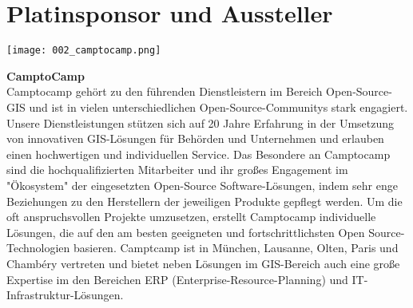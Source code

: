 \section*{Platinsponsor und Aussteller}
  \texttt{[image: 002\_camptocamp.png]}
  \vspace{1.0\baselineskip}
  
\noindent
    {\bfseries CamptoCamp}\\
    Camptocamp gehört zu den führenden Dienstleistern im Bereich Open-Source-GIS und ist in vielen unterschiedlichen Open-Source-Communitys stark engagiert.
\noindent
Unsere Dienstleistungen stützen sich auf 20 Jahre Erfahrung in der Umsetzung von innovativen GIS-Lösungen für Behörden und Unternehmen und erlauben einen hochwertigen und individuellen Service. Das Besondere an Camptocamp sind die hochqualifizierten Mitarbeiter und ihr großes Engagement im "Ökosystem" der eingesetzten Open-Source Software-Lösungen, indem sehr enge Beziehungen zu den Herstellern der jeweiligen Produkte gepflegt werden.
\noindent
Um die oft anspruchsvollen Projekte umzusetzen, erstellt Camptocamp individuelle Lösungen, die auf den am besten geeigneten und fortschrittlichsten Open Source-Technologien basieren. Camptcamp ist in München, Lausanne, Olten, Paris und Chambéry vertreten und bietet neben Lösungen im GIS-Bereich auch eine große Expertise im den Bereichen ERP (Enterprise-Resource-Planning) und IT-Infrastruktur-Lösungen.
